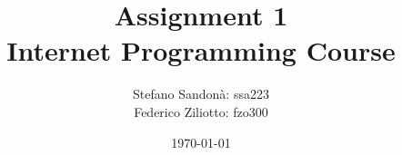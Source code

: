 \title{
Assignment 1 \\
Internet Programming Course
}
\author{
Stefano Sandonà: ssa223 \\
Federico Ziliotto: fzo300
}
\date{\today}







\linespread{1.2}
\setlength{\parindent}{14pt}   %


\ifxetex
{}
\setsansfont{Droid Sans}
\setmonofont{Droid Sans Mono}
\else
  \usepackage[T1]{fontenc}
  \usepackage{newtxtext,newtxmath}
\fi


\newcommand\mycommfont[1]{\scriptsize\ttfamily\textcolor{blue}{#1}}

\makeatletter
\renewcommand{\listalgorithmcfname}{Lista degli Algoritmi}%
\renewcommand{\algorithmcfname}{Algoritmo}%
\renewcommand{\algocf@typo}{}%
\renewcommand{\@algocf@procname}{Procedura}
\renewcommand{\@algocf@funcname}{Funzione}
\makeatother




